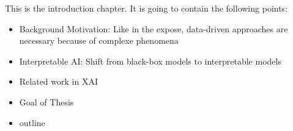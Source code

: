 \documentclass[10pt,a4paper]{article}
\begin{document}
This is the introduction chapter. It is going to contain the following points:

\begin{itemize}
	\item Background Motivation: Like in the expose, data-driven approaches are necessary because of complexe phenomena
	\item Interpretable AI: Shift from black-box models to interpretable models
	\item Related work in XAI
	\item Goal of Thesis
	\item outline
\end{itemize}
	
\printbibliography
	
\end{document}
